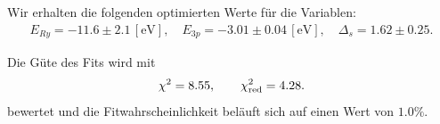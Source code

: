 Wir erhalten die folgenden optimierten Werte für die Variablen:
\begin{align}
  E_{Ry} = -11.6 \pm 2.1\, [\si{\electronvolt}], \quad
  E_{3p} = -3.01 \pm 0.04\, [\si{\electronvolt}], \quad
  \Delta_s = 1.62 \pm 0.25.
\end{align}

Die Güte des Fits wird mit
\begin{align}
  \chi^{2} = 8.55,\qquad \chi^{2}_{\mathrm{red}} = 4.28.
\end{align}
bewertet und die Fitwahrscheinlichkeit beläuft sich auf einen Wert von $1.0\%$.
